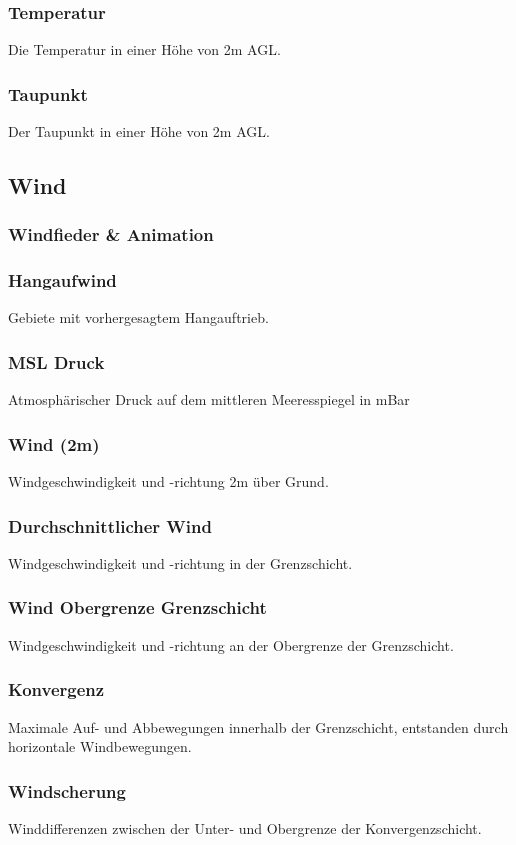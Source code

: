 \documentclass[11pt,a4paper]{article}
\begin{document}
\subsubsection{Temperatur}
Die Temperatur in einer Höhe von 2m AGL.
\subsubsection{Taupunkt}
Der Taupunkt in einer Höhe von 2m AGL.
\subsection{Wind}
\subsubsection{Windfieder \& Animation}
\subsubsection{Hangaufwind}
Gebiete mit vorhergesagtem Hangauftrieb.
\subsubsection{MSL Druck}
Atmosphärischer Druck auf dem mittleren Meeresspiegel in mBar
\subsubsection{Wind (2m)}
Windgeschwindigkeit und -richtung 2m über Grund.
\subsubsection{Durchschnittlicher Wind}
Windgeschwindigkeit und -richtung in der Grenzschicht.
\subsubsection{Wind Obergrenze Grenzschicht}
Windgeschwindigkeit und -richtung an der Obergrenze der Grenzschicht.
\subsubsection{Konvergenz}
Maximale Auf- und Abbewegungen innerhalb der Grenzschicht, entstanden durch horizontale Windbewegungen.
\subsubsection{Windscherung}
Winddifferenzen zwischen der Unter- und Obergrenze der Konvergenzschicht.
\end{document}
